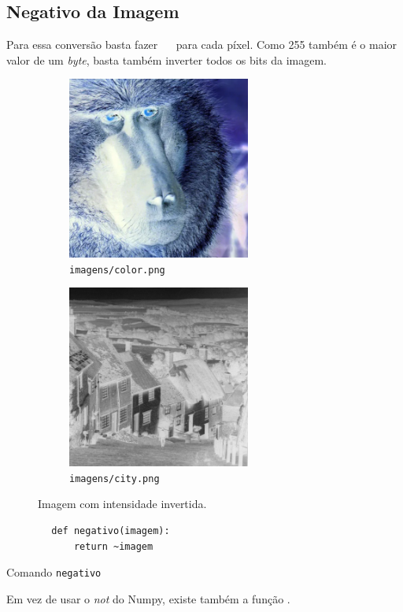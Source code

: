 \subsection{Negativo da Imagem}

Para essa conversão basta fazer ~~ para cada píxel. Como 255 também é o maior valor de um \textit{byte}, basta também inverter todos os bits da imagem.

\begin{figure}[H]
    \centering
    \begin{subfigure}{0.45\textwidth}
        \centering
        \includegraphics[width=6cm]{resultados/colorneg.png}
        \caption{\texttt{imagens/color.png}}
    \end{subfigure}%
    \begin{subfigure}{0.45\textwidth}
        \centering
        \includegraphics[width=6cm]{resultados/cityneg.png}
        \caption{\texttt{imagens/city.png}}
    \end{subfigure}

    \caption{Imagem com intensidade invertida.}
\end{figure}

\begin{listing}[H]
    \begin{verbatim}
        def negativo(imagem):
            return ~imagem
    \end{verbatim}

    \caption{Comando \texttt{negativo}}
\end{listing}

Em vez de usar o \textit{not} do Numpy, existe também a função  \autocite{ref:bitwise_not}.
